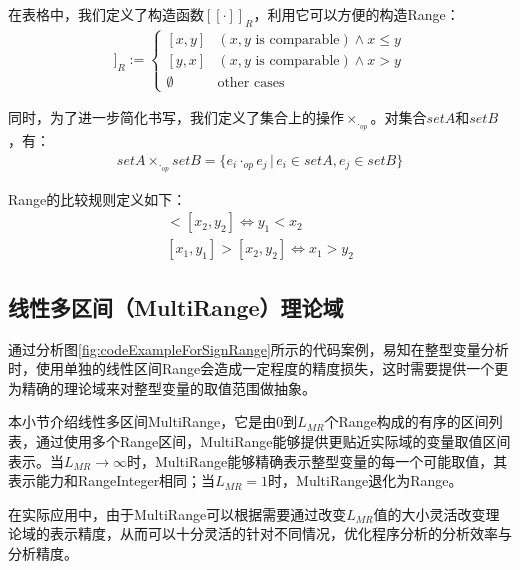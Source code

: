 在表格中，我们定义了构造函数$ [[\cdot]]_R $，利用它可以方便的构造Range：
\begin{align}
[[x, y]]_R := \begin{cases}
[x, y] & (x, y \text{ is comparable}) \land x \le y\\
[y, x] & (x, y \text{ is comparable}) \land x > y\\
\emptyset & \text{other cases}
\end{cases}
\end{align}

同时，为了进一步简化书写，我们定义了集合上的操作$ \times_{\cdot_{op}} $。对集合$ setA $和$ setB $，有：
\begin{align}
setA  \times_{\cdot_{op}} setB =  \{ e_i \cdot_{op} e_j \, | \, e_i \in setA, e_j \in setB \} 
\end{align}

Range的比较规则定义如下：
\begin{align}
	[x_1, y_1] < [x_2, y_2] \iff y_1 < x_2\\
	[x_1, y_1] > [x_2, y_2] \iff x_1 > y_2
\end{align}

\subsection{线性多区间（MultiRange）理论域}

通过分析图\ref{fig:codeExampleForSignRange}所示的代码案例，易知在整型变量分析时，使用单独的线性区间Range会造成一定程度的精度损失，这时需要提供一个更为精确的理论域来对整型变量的取值范围做抽象。

本小节介绍线性多区间MultiRange，它是由0到$ L_{MR} $个Range构成的有序的区间列表，通过使用多个Range区间，MultiRange能够提供更贴近实际域的变量取值区间表示。当$ L_{MR}  \rightarrow \infty $时，MultiRange能够精确表示整型变量的每一个可能取值，其表示能力和RangeInteger相同；当$ L_{MR} = 1 $时，MultiRange退化为Range。

在实际应用中，由于MultiRange可以根据需要通过改变$ L_{MR} $值的大小灵活改变理论域的表示精度，从而可以十分灵活的针对不同情况，优化程序分析的分析效率与分析精度。

